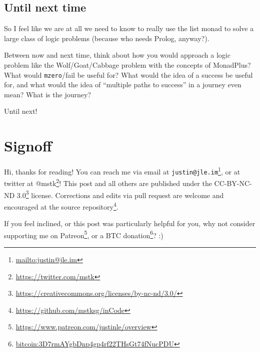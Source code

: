 \documentclass[]{article}
\renewcommand{\href}[2]{#2\footnote{\url{#1}}}
\begin{document}
\subsection{Until next time}\label{until-next-time}

So I feel like we are at all we need to know to really use the list monad to
solve a large class of logic problems (because who needs Prolog, anyway?).

Between now and next time, think about how you would approach a logic problem
like the Wolf/Goat/Cabbage problem with the concepts of MonadPlus? What would
\texttt{mzero}/fail be useful for? What would the idea of a success be useful
for, and what would the idea of ``multiple paths to success'' in a journey even
mean? What is the journey?

Until next!

\section{Signoff}\label{signoff}

Hi, thanks for reading! You can reach me via email at
\href{mailto:justin@jle.im}{\nolinkurl{justin@jle.im}}, or at twitter at
\href{https://twitter.com/mstk}{@mstk}! This post and all others are published
under the \href{https://creativecommons.org/licenses/by-nc-nd/3.0/}{CC-BY-NC-ND
3.0} license. Corrections and edits via pull request are welcome and encouraged
at \href{https://github.com/mstksg/inCode}{the source repository}.

If you feel inclined, or this post was particularly helpful for you, why not
consider \href{https://www.patreon.com/justinle/overview}{supporting me on
Patreon}, or a \href{bitcoin:3D7rmAYgbDnp4gp4rf22THsGt74fNucPDU}{BTC donation}?
:)
\end{document}
